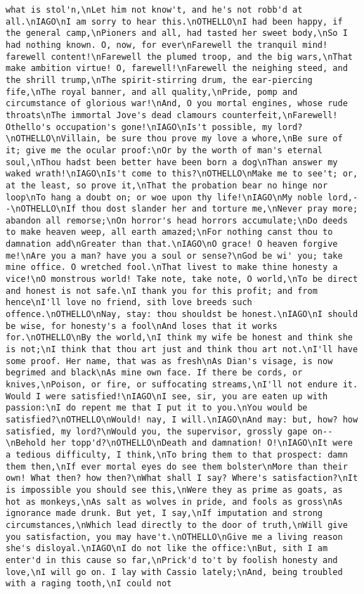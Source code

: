 \begin{verbatim}
what is stol'n,\nLet him not know't, and he's not robb'd at all.\nIAGO\nI am sorry to hear this.\nOTHELLO\nI had been happy, if the general camp,\nPioners and all, had tasted her sweet body,\nSo I had nothing known. O, now, for ever\nFarewell the tranquil mind! farewell content!\nFarewell the plumed troop, and the big wars,\nThat make ambition virtue! O, farewell!\nFarewell the neighing steed, and the shrill trump,\nThe spirit-stirring drum, the ear-piercing fife,\nThe royal banner, and all quality,\nPride, pomp and circumstance of glorious war!\nAnd, O you mortal engines, whose rude throats\nThe immortal Jove's dead clamours counterfeit,\nFarewell! Othello's occupation's gone!\nIAGO\nIs't possible, my lord?\nOTHELLO\nVillain, be sure thou prove my love a whore,\nBe sure of it; give me the ocular proof:\nOr by the worth of man's eternal soul,\nThou hadst been better have been born a dog\nThan answer my waked wrath!\nIAGO\nIs't come to this?\nOTHELLO\nMake me to see't; or, at the least, so prove it,\nThat the probation bear no hinge nor loop\nTo hang a doubt on; or woe upon thy life!\nIAGO\nMy noble lord,--\nOTHELLO\nIf thou dost slander her and torture me,\nNever pray more; abandon all remorse;\nOn horror's head horrors accumulate;\nDo deeds to make heaven weep, all earth amazed;\nFor nothing canst thou to damnation add\nGreater than that.\nIAGO\nO grace! O heaven forgive me!\nAre you a man? have you a soul or sense?\nGod be wi' you; take mine office. O wretched fool.\nThat livest to make thine honesty a vice!\nO monstrous world! Take note, take note, O world,\nTo be direct and honest is not safe.\nI thank you for this profit; and from hence\nI'll love no friend, sith love breeds such offence.\nOTHELLO\nNay, stay: thou shouldst be honest.\nIAGO\nI should be wise, for honesty's a fool\nAnd loses that it works for.\nOTHELLO\nBy the world,\nI think my wife be honest and think she is not;\nI think that thou art just and think thou art not.\nI'll have some proof. Her name, that was as fresh\nAs Dian's visage, is now begrimed and black\nAs mine own face. If there be cords, or knives,\nPoison, or fire, or suffocating streams,\nI'll not endure it. Would I were satisfied!\nIAGO\nI see, sir, you are eaten up with passion:\nI do repent me that I put it to you.\nYou would be satisfied?\nOTHELLO\nWould! nay, I will.\nIAGO\nAnd may: but, how? how satisfied, my lord?\nWould you, the supervisor, grossly gape on--\nBehold her topp'd?\nOTHELLO\nDeath and damnation! O!\nIAGO\nIt were a tedious difficulty, I think,\nTo bring them to that prospect: damn them then,\nIf ever mortal eyes do see them bolster\nMore than their own! What then? how then?\nWhat shall I say? Where's satisfaction?\nIt is impossible you should see this,\nWere they as prime as goats, as hot as monkeys,\nAs salt as wolves in pride, and fools as gross\nAs ignorance made drunk. But yet, I say,\nIf imputation and strong circumstances,\nWhich lead directly to the door of truth,\nWill give you satisfaction, you may have't.\nOTHELLO\nGive me a living reason she's disloyal.\nIAGO\nI do not like the office:\nBut, sith I am enter'd in this cause so far,\nPrick'd to't by foolish honesty and love,\nI will go on. I lay with Cassio lately;\nAnd, being troubled with a raging tooth,\nI could not 
\end{verbatim}

